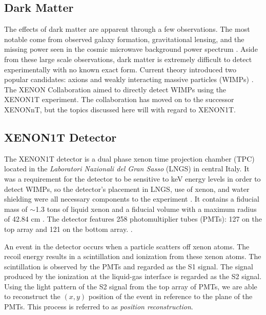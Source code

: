 \subsection{Dark Matter}
The effects of dark matter are apparent through a few observations.
The most notable come from observed galaxy formation, gravitational lensing, and the missing power seen in the cosmic microwave background power spectrum \cite{DM_Hist}.
Aside from these large scale observations, dark matter is extremely difficult to detect experimentally with no known exact form.
Current theory introduced two popular candidates: axions and weakly interacting massive particles (WIMPs) \cite{DM_Hist}.
The XENON Collaboration aimed to directly detect WIMPs using the XENON1T experiment.
The collaboration has moved on to the successor XENONnT, but the topics discussed here will with regard to XENON1T.

\subsection{XENON1T Detector}
The XENON1T detector is a dual phase xenon time projection chamber (TPC) located in the \textit{Laboratori Nazionali del Gran Sasso} (LNGS) in central Italy.
It was a requirement for the detector to be sensitive to keV energy levels in order to detect WIMPs, so the detector's placement in LNGS, use of xenon, and water shielding were all necessary components to the experiment \cite{Xenon1t}.
It contains a fiducial mass of $\sim$1.3 tons of liquid xenon and a fiducial volume with a maximum radius of 42.84 cm \cite{1TDM_DataAnalysis}.
The detector features 258 photomultiplier tubes (PMTs): 127 on the top array and 121 on the bottom array.
 \cite{Xenon1t}.

\par An event in the detector occurs when a particle scatters off xenon atoms.
The recoil energy results in a scintillation and ionization from these xenon atoms.
The scintillation is observed by the PMTs and regarded as the S1 signal.
The signal produced by the ionization at the liquid-gas interface is regarded as the S2 signal.
Using the light pattern of the S2 signal from the top array of PMTs, we are able to reconstruct the $(x, y)$ position of the event in reference to the plane of the PMTs.
This process is referred to as \textit{position reconstruction}.

